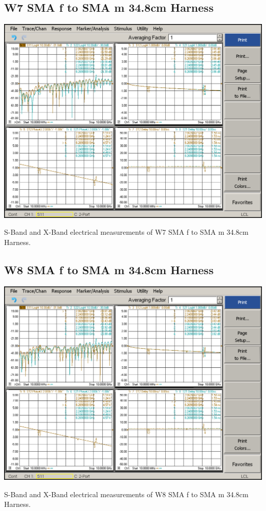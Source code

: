 \subsection{W7 SMA f to SMA m 34.8cm Harness}

\begin{table}[H]
	\centering
	\includegraphics[width=0.8\linewidth]{figuras/measures/W7_10M_10G}
	\caption{S-Band and X-Band electrical measurements of W7 SMA f to SMA m 34.8cm Harness.}
	\label{fig:W7}
\end{table}

\subsection{W8 SMA f to SMA m 34.8cm Harness}

\begin{table}[H]
	\centering
	\includegraphics[width=0.8\linewidth]{figuras/measures/W8_10M_10G}
	\caption{S-Band and X-Band electrical measurements of W8 SMA f to SMA m 34.8cm Harness.}
	\label{fig:W8}
\end{table}

